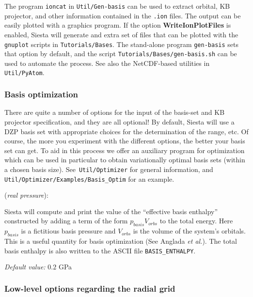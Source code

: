 \documentclass[11pt]{article}
\begin{document}
The program {\tt ioncat} in {\tt Util/Gen-basis} can be used to
extract orbital, KB projector, and other information contained in the
{\tt .ion} files. The output can be easily plotted with a graphics
program.  If the option {\bf WriteIonPlotFiles} is enabled, {\sc
  Siesta} will generate and extra set of files that can be plotted
with the {\tt gnuplot} scripts in {\tt Tutorials/Bases}.
The stand-alone program {\tt gen-basis} sets that option by default, and
the script {\tt Tutorials/Bases/gen-basis.sh} can be used to automate
the process. See also the NetCDF-based utilities in {\tt
  Util/PyAtom}. 

\subsubsection{Basis optimization}

There are quite a number of options for the input of the basis-set and
KB projector specification, and they are all optional! By default,
{\sc Siesta} will use a DZP basis set with appropriate choices for the
determination of the range, etc. Of course, the more you experiment
with the different options, the better your basis set can get. To aid
in this process we offer an auxiliary program for optimization which
can be used in particular to obtain variationally optimal basis sets
(within a chosen basis size). See {\tt Util/Optimizer}
for general information, and {\tt Util/Optimizer/Examples/Basis\_Optim}
for an example.

\begin{description}
\itemsep 10pt
\parsep 0pt
\item[{\bf BasisPressure}] ({\it real pressure}):

{\sc Siesta} will compute and print the value of the ``effective basis
enthalpy'' constructed by adding a term of the form
$p_{basis}V_{orbs}$ to the total energy. Here $p_{basis}$ is a
fictitious basis pressure and $V_{orbs}$ is the volume of the system's
orbitals. This is a useful quantity for basis optimization (See
Anglada {\it et al.\/}). The total basis enthalpy is also written to
the ASCII file {\tt BASIS\_ENTHALPY}.

{\it Default value:} { $0.2$ GPa}

\end{description}

\subsubsection{Low-level options regarding the radial grid}
\end{document}
